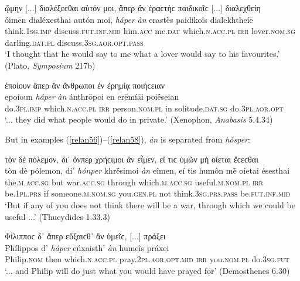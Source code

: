 \begin{exe}
\ex ᾤμην {[}...{]} διαλέξεϲθαι αὐτόν μοι, ἅπερ ἂν ἐραϲτὴϲ παιδικοῖϲ {[}...{]} διαλεχθείη\\
\gll ṓimēn dialéxesthai autón moi, \emph{háper} \emph{àn} erastḕs paidikoîs dialekhtheíē\\
think.\textsc{1sg.imp} discuss.\textsc{fut.inf.mid} him.\textsc{acc} me.\textsc{dat} which.\textsc{n.acc.pl} \textsc{irr} lover.\textsc{nom.sg} darling.\textsc{dat.pl} discuss.\textsc{3sg.aor.opt.pass}\\
\trans `I thought that he would say to me what a lover would say to his favourites.' (Plato, \textit{Symposium} 217b)
\label{relan54}
\end{exe}

\begin{exe}
\ex ἐποίουν ἅπερ ἂν ἄνθρωποι ἐν ἐρημίᾳ ποιήϲειαν\\
\gll epoíoun \emph{háper} \emph{àn} ánthrōpoi en erēmíāi poiḗseian\\
do.\textsc{3pl.imp} which.\textsc{n.acc.pl} \textsc{irr} person.\textsc{nom.pl} in solitude.\textsc{dat.sg} do.\textsc{3pl.aor.opt}\\
\trans `... they did what people would do in private.' (Xenophon, \textit{Anabasis} 5.4.34)
\label{relan55}
\end{exe}

But in examples (\ref{relan56})--(\ref{relan58}), \emph{án} is separated from \emph{hósper}:

\begin{exe}
\ex τὸν δὲ πόλεμον, δι᾽ ὅνπερ χρήϲιμοι ἂν εἶμεν, εἴ τιϲ ὑμῶν μὴ οἴεται ἔϲεϲθαι\\
\gll tòn dè pólemon, di' \emph{hónper} khrḗsimoi \emph{àn} eîmen, eí tis humôn mḕ oíetai ésesthai\\
the.\textsc{m.acc.sg} but war.\textsc{acc.sg} through which.\textsc{m.acc.sg} useful.\textsc{m.nom.pl} \textsc{irr} be.\textsc{1pl.prs} if someone.\textsc{m.nom.sg} you.\textsc{gen.pl} not think.\textsc{3sg.prs.pass} be.\textsc{fut.inf.mid}\\
\trans `But if any of you does not think there will be a war, through which we could be useful ...' (Thucydides 1.33.3)
\label{relan56}
\end{exe}

\begin{exe}
\ex Φίλιπποϲ δ᾽ ἅπερ εὔξαιϲθ᾽ ἂν ὑμεῖϲ, {[}...{]} πράξει\\
\gll Phílippos d' \emph{háper} eúxaisth' \emph{àn} humeîs práxei\\
Philip.\textsc{nom} then which.\textsc{n.acc.pl} pray.\textsc{2pl.aor.opt.mid} \textsc{irr} you.\textsc{nom.pl} do.\textsc{3sg.fut}\\
\trans `... and Philip will do just what you would have prayed for' (Demosthenes 6.30)
\label{relan57}
\end{exe}

